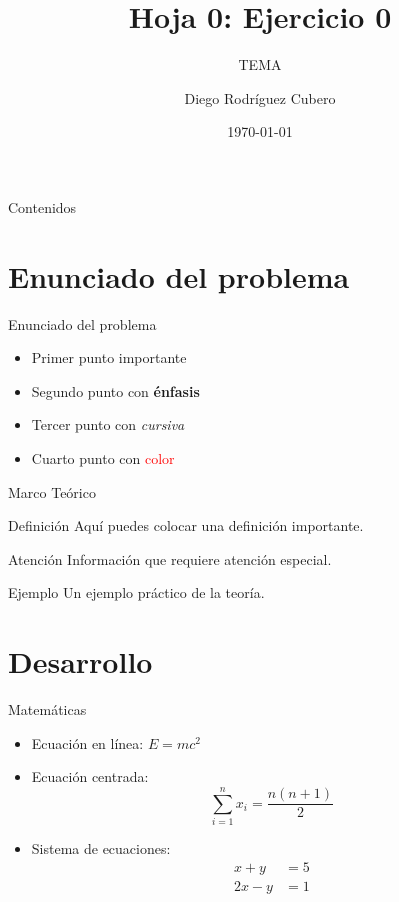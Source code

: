 \documentclass[aspectratio=169]{beamer}
\title{Hoja 0: Ejercicio 0}
\subtitle{TEMA}
\author{Diego Rodríguez Cubero}
\institute{UCM}
\date{\today}
\begin{document}
\begin{frame}
    \titlepage
\end{frame}

\begin{frame}{Contenidos}
    \tableofcontents
\end{frame}

\section{Enunciado del problema}
\begin{frame}{Enunciado del problema}
    \begin{itemize}
        \item Primer punto importante
        \item Segundo punto con \textbf{énfasis}
        \item Tercer punto con \textit{cursiva}
        \item Cuarto punto con \textcolor{red}{color}
    \end{itemize}
\end{frame}

\begin{frame}{Marco Teórico}
    \begin{block}{Definición}
        Aquí puedes colocar una definición importante.
    \end{block}
    
    \begin{alertblock}{Atención}
        Información que requiere atención especial.
    \end{alertblock}
    
    \begin{exampleblock}{Ejemplo}
        Un ejemplo práctico de la teoría.
    \end{exampleblock}
\end{frame}

\section{Desarrollo}

\begin{frame}{Matemáticas}
    \begin{itemize}
        \item Ecuación en línea: $E = mc^2$
        \item Ecuación centrada:
        \begin{equation}
            \sum_{i=1}^{n} x_i = \frac{n(n+1)}{2}
        \end{equation}
        \item Sistema de ecuaciones:
        \begin{align}
            x + y &= 5 \\
            2x - y &= 1
        \end{align}
    \end{itemize}
\end{frame}
\end{document}
